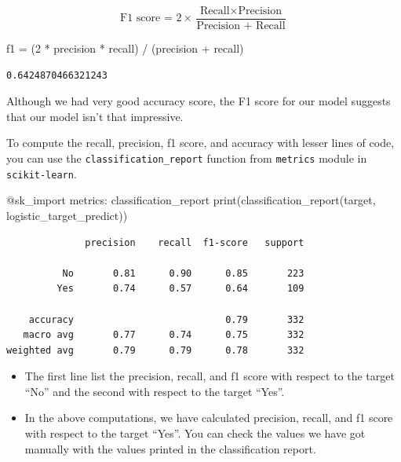 \documentclass[
  letterpaper,
]{book}
\newenvironment{Shaded}{\begin{snugshade}}{\end{snugshade}}
\newcommand{\FloatTok}[1]{\textcolor[rgb]{0.68,0.00,0.00}{#1}}
\newcommand{\FunctionTok}[1]{\textcolor[rgb]{0.28,0.35,0.67}{#1}}
\newcommand{\NormalTok}[1]{\textcolor[rgb]{0.00,0.23,0.31}{#1}}
\newcommand{\OperatorTok}[1]{\textcolor[rgb]{0.37,0.37,0.37}{#1}}
\newcommand{\PreprocessorTok}[1]{\textcolor[rgb]{0.68,0.00,0.00}{#1}}
\providecommand{\tightlist}{%
  \setlength{\itemsep}{0pt}\setlength{\parskip}{0pt}}\usepackage{longtable,booktabs,array}
\begin{document}
\[\text{F1 score = } 2 \times \frac{\text{Recall} \times \text{Precision}}{\text{Precision + Recall}}\]

\begin{Shaded}
\begin{Highlighting}[]
\NormalTok{f1 }\OperatorTok{=}\NormalTok{ (}\FloatTok{2} \OperatorTok{*}\NormalTok{ precision }\OperatorTok{*}\NormalTok{ recall) }\OperatorTok{/}\NormalTok{ (precision }\OperatorTok{+}\NormalTok{ recall)}
\end{Highlighting}
\end{Shaded}

\begin{verbatim}
0.6424870466321243
\end{verbatim}

Although we had very good accuracy score, the F1 score for our model
suggests that our model isn't that impressive.

To compute the recall, precision, f1 score, and accuracy with lesser
lines of code, you can use the \texttt{classification\_report} function
from \texttt{metrics} module in \texttt{scikit-learn}.

\begin{Shaded}
\begin{Highlighting}[]
\PreprocessorTok{@sk\_import}\NormalTok{ metrics}\OperatorTok{:}\NormalTok{ classification\_report}
\FunctionTok{print}\NormalTok{(}\FunctionTok{classification\_report}\NormalTok{(target, logistic\_target\_predict))}
\end{Highlighting}
\end{Shaded}

\begin{verbatim}
              precision    recall  f1-score   support

          No       0.81      0.90      0.85       223
         Yes       0.74      0.57      0.64       109

    accuracy                           0.79       332
   macro avg       0.77      0.74      0.75       332
weighted avg       0.79      0.79      0.78       332
\end{verbatim}

\begin{itemize}
\tightlist
\item
  The first line list the precision, recall, and f1 score with respect
  to the target ``No'' and the second with respect to the target
  ``Yes''.
\item
  In the above computations, we have calculated precision, recall, and
  f1 score with respect to the target ``Yes''. You can check the values
  we have got manually with the values printed in the classification
  report.
\end{itemize}
\end{document}
